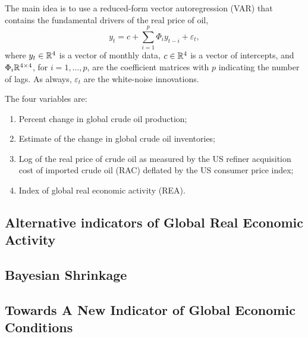 The main idea is to use a reduced-form vector autoregression (VAR) that contains the fundamental drivers of the real price of oil,
\begin{equation}
	y_t = c + \sum_{i=1}^p \Phi_i y_{t-i} + \varepsilon_t,
\end{equation}
where $y_{t}\in\mathbb{R}^4$ is a vector of monthly data, $c\in\mathbb{R}^4$ is a vector of intercepts, and $\Phi_i\mathbb{R}^{4\times 4}$, for $i=1,\ldots, p$, are the coefficient matrices with $p$ indicating the number of lags. As always, $\varepsilon_t$ are the white-noise innovations.

The four variables are:
\begin{enumerate}[wide, itemsep=0cm, topsep=0cm]
	\item Percent change in global crude oil production;
	\item Estimate of the change in global crude oil inventories;
	\item Log of the real price of crude oil as measured by the US refiner acquisition cost of imported crude oil (RAC) deflated by the US consumer price index;
	\item Index of global real economic activity (REA).
\end{enumerate}

\subsection{Alternative indicators of Global Real Economic Activity}



\subsection{Bayesian Shrinkage}



\subsection{Towards A New Indicator of Global Economic Conditions}


